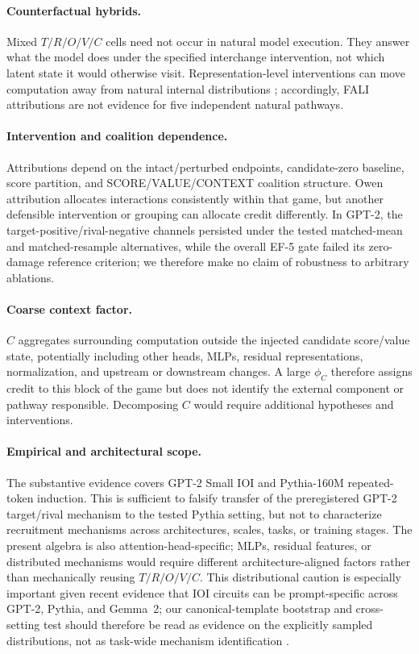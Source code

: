 \paragraph{Counterfactual hybrids.}
Mixed $T/R/O/V/C$ cells need not occur in natural model execution. They answer what the model does under the specified interchange intervention, not which latent state it would otherwise visit. Representation-level interventions can move computation away from natural internal distributions \citep{grant2025divergent}; accordingly, FALI attributions are not evidence for five independent natural pathways.

\paragraph{Intervention and coalition dependence.}
Attributions depend on the intact/perturbed endpoints, candidate-zero baseline, score partition, and SCORE/VALUE/CONTEXT coalition structure. Owen attribution allocates interactions consistently within that game, but another defensible intervention or grouping can allocate credit differently. In GPT-2, the target-positive/rival-negative channels persisted under the tested matched-mean and matched-resample alternatives, while the overall EF-5 gate failed its zero-damage reference criterion; we therefore make no claim of robustness to arbitrary ablations.

\paragraph{Coarse context factor.}
$C$ aggregates surrounding computation outside the injected candidate score/value state, potentially including other heads, MLPs, residual representations, normalization, and upstream or downstream changes. A large $\phi_C$ therefore assigns credit to this block of the game but does not identify the external component or pathway responsible. Decomposing $C$ would require additional hypotheses and interventions.

\paragraph{Empirical and architectural scope.}
The substantive evidence covers GPT-2 Small IOI and Pythia-160M repeated-token induction. This is sufficient to falsify transfer of the preregistered GPT-2 target/rival mechanism to the tested Pythia setting, but not to characterize recruitment mechanisms across architectures, scales, tasks, or training stages. The present algebra is also attention-head-specific; MLPs, residual features, or distributed mechanisms would require different architecture-aligned factors rather than mechanically reusing $T/R/O/V/C$. This distributional caution is especially important given recent evidence that IOI circuits can be prompt-specific across GPT-2, Pythia, and Gemma~2; our canonical-template bootstrap and cross-setting test should therefore be read as evidence on the explicitly sampled distributions, not as task-wide mechanism identification \citep{franco2026promptspecific}.

